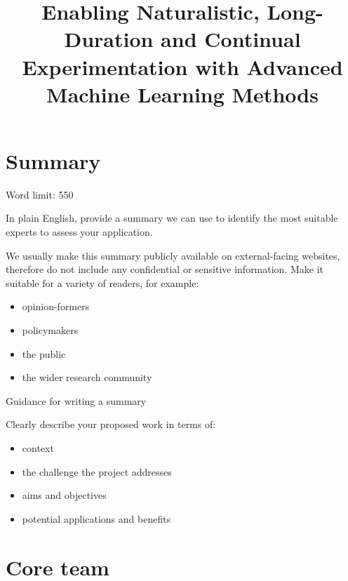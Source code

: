 \documentclass[11pt]{article}
\title{Enabling Naturalistic, Long-Duration and Continual Experimentation with
Advanced Machine Learning Methods}
\newenvironment{instruction}{%
    \begin{tcolorbox}[breakable,colback=red!5,colframe=red,title=Instruction]%
	}{%
    	\end{tcolorbox}%
	}
\begin{document}

\tableofcontents

\pagebreak

\section{Summary}

\begin{instruction}
Word limit: 550

In plain English, provide a summary we can use to identify the most suitable
experts to assess your application.

We usually make this summary publicly available on external-facing websites,
therefore do not include any confidential or sensitive information. Make it
suitable for a variety of readers, for example:

\begin{itemize}
	\item opinion-formers
	\item policymakers
	\item the public
	\item the wider research community
\end{itemize}

Guidance for writing a summary

Clearly describe your proposed work in terms of:

\begin{itemize}
	\item context
	\item the challenge the project addresses
	\item aims and objectives
	\item potential applications and benefits
\end{itemize}

\end{instruction}

% 

\pagebreak
\section{Core team}
\end{document}
